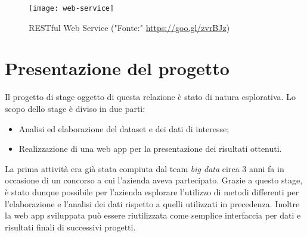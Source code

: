 \begin{figure}[!h] 
	\centering 
	\texttt{[image: web-service]}
	\caption{RESTful Web Service ("Fonte:" \href{https://goo.gl/zvrBJz}{https://goo.gl/zvrBJz})}
\end{figure}

\section{Presentazione del progetto}
Il progetto di stage oggetto di questa relazione è stato di natura esplorativa. Lo scopo dello stage è diviso in due parti:
\begin{itemize}
	\item Analisi ed elaborazione del dataset e dei dati di interesse;
	\item Realizzazione di una \gls{web app} per la presentazione dei risultati ottenuti.
\end{itemize}
La prima attività era già stata compiuta dal team \textit{big data} circa 3 anni fa in occasione di un concorso a cui l'azienda aveva partecipato.
Grazie a questo stage, è stato dunque possibile per l'azienda esplorare l'utilizzo di metodi differenti per l'elaborazione e l'analisi dei dati rispetto a quelli utilizzati in precedenza. 
Inoltre la \gls{web app} sviluppata può essere riutilizzata come semplice interfaccia per dati e risultati finali di successivi progetti.
